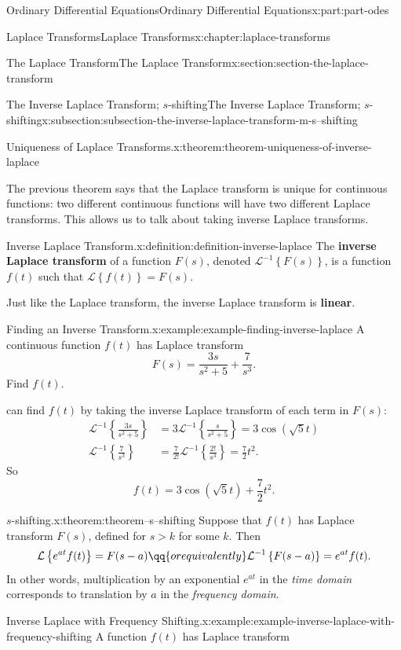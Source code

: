 \documentclass[oneside,10pt,]{book}
\newcommand{\terminology}[1]{\textbf{#1}}
\numberwithin{equation}{part}
\newcommand{\Laplace}[1]{\mathcal{L}\left\{#1\right\}}
\newcommand{\iLaplace}[1]{\mathcal{L}^{-1}\left\{#1\right\}}
\newcommand{\gt}{>}
\newcommand{\amp}{&}
\begin{document}
\begin{partptx}{Ordinary Differential Equations}{}{Ordinary Differential Equations}{}{}{x:part:part-odes}
\begin{chapterptx}{Laplace Transforms}{}{Laplace Transforms}{}{}{x:chapter:laplace-transforms}
\begin{sectionptx}{The Laplace Transform}{}{The Laplace Transform}{}{}{x:section:section-the-laplace-transform}
\begin{subsectionptx}{The Inverse Laplace Transform; \(s\)-shifting}{}{The Inverse Laplace Transform; \(s\)-shifting}{}{}{x:subsection:subsection-the-inverse-laplace-transform-m-s--shifting}
\begin{theorem}{Uniqueness of Laplace Transforms.}{}{x:theorem:theorem-uniqueness-of-inverse-laplace}
\end{theorem}
The previous theorem says that the Laplace transform is unique for continuous functions: two different continuous functions will have two different Laplace transforms. This allows us to talk about taking inverse Laplace transforms.%
\begin{definition}{Inverse Laplace Transform.}{x:definition:definition-inverse-laplace}%
The \terminology{inverse Laplace transform} of a function \(F(s)\), denoted \(\mathcal{L}^{-1}\left\{F(s)\right\}\), is a function \(f(t)\) such that \(\Laplace{f(t)} = F(s)\).%
\end{definition}
Just like the Laplace transform, the inverse Laplace transform is \terminology{linear}.%
\begin{example}{Finding an Inverse Transform.}{x:example:example-finding-inverse-laplace}%
A continuous function \(f(t)\) has Laplace transform%
\begin{equation*}
F(s) = \frac{3s}{s^{2}+5} + \frac{7}{s^{3}}.
\end{equation*}
Find \(f(t)\).%
\par\smallskip%
\noindentWe can find \(f(t)\) by taking the inverse Laplace transform of each term in \(F(s)\):%
\begin{align*}
\iLaplace{\frac{3s}{s^{2}+5}} \amp= 3\iLaplace{\frac{s}{s^{2}+5}} = 3\cos(\sqrt{5}t)\\
\iLaplace{\frac{7}{s^{3}}} \amp= \frac{7}{2!}\iLaplace{\frac{2!}{s^{3}}} = \frac{7}{2}t^{2}\text{.}
\end{align*}
So%
\begin{equation*}
f(t) = 3\cos(\sqrt{5}t)+\frac{7}{2}t^{2}.
\end{equation*}
%
\end{example}
\begin{theorem}{\(s\)-shifting.}{}{x:theorem:theorem--s--shifting}%
Suppose that \(f(t)\) has Laplace transform \(F(s)\), defined for \(s\gt k\) for some \(k\). Then%
\begin{equation*}
\Laplace{e^{at}f(t)} = F(s-a)\qq{or equivalently} \iLaplace{F(s-a)} = e^{at}f(t).
\end{equation*}
In other words, multiplication by an exponential \(e^{at}\) in the \emph{time domain} corresponds to translation by \(a\) in the \emph{frequency domain}.%
\end{theorem}
\begin{example}{Inverse Laplace with Frequency Shifting.}{x:example:example-inverse-laplace-with-frequency-shifting}%
A function \(f(t)\) has Laplace transform%

\end{example}
\end{subsectionptx}
\end{sectionptx}
\end{chapterptx}
\end{partptx}
\end{document}

